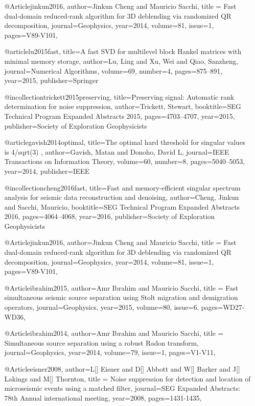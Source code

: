 @Article{jinkun2016,
  author={Jinkun Cheng and Mauricio Sacchi},
  title = {Fast dual-domain reduced-rank algorithm for 3{D} deblending via randomized QR decomposition},
  journal={Geophysics},
  year=2014,
  volume=81,
  issue=1,
  pages={V89-V101},
}

@article{lu2015fast,
  title={A fast SVD for multilevel block Hankel matrices with minimal memory storage},
  author={Lu, Ling and Xu, Wei and Qiao, Sanzheng},
  journal={Numerical Algorithms},
  volume={69},
  number={4},
  pages={875--891},
  year={2015},
  publisher={Springer}
}

@incollection{trickett2015preserving,
  title={Preserving signal: Automatic rank determination for noise suppression},
  author={Trickett, Stewart},
  booktitle={SEG Technical Program Expanded Abstracts 2015},
  pages={4703--4707},
  year={2015},
  publisher={Society of Exploration Geophysicists}
}

@article{gavish2014optimal,
  title={The optimal hard threshold for singular values is 4/sqrt(3) },
  author={Gavish, Matan and Donoho, David L},
  journal={IEEE Transactions on Information Theory},
  volume={60},
  number={8},
  pages={5040--5053},
  year={2014},
  publisher={IEEE}
}

@incollection{cheng2016fast,
  title={Fast and memory-efficient singular spectrum analysis for seismic data reconstruction and denoising},
  author={Cheng, Jinkun and Sacchi, Mauricio},
  booktitle={SEG Technical Program Expanded Abstracts 2016},
  pages={4064--4068},
  year={2016},
  publisher={Society of Exploration Geophysicists}
}

@Article{jinkun2016,
  author={Jinkun Cheng and Mauricio Sacchi},
  title = {Fast dual-domain reduced-rank algorithm for 3{D} deblending via randomized QR decomposition},
  journal={Geophysics},
  year=2014,
  volume=81,
  issue=1,
  pages={V89-V101},
}

@Article{ibrahim2015,
  author={Amr Ibrahim and Mauricio Sacchi},
  title = {Fast simultaneous seismic source separation using Stolt migration and demigration operators},
  journal={Geophysics},
  year=2015,
  volume=80,
  issue=6,
  pages={WD27-WD36},
}

@Article{ibrahim2014,
  author={Amr Ibrahim and Mauricio Sacchi},
  title = {Simultaneous source separation using a robust {R}adon transform},
  journal={Geophysics},
  year=2014,
  volume=79,
  issue=1,
  pages={V1-V11},
}


@Article{eisner2008,
  author={L[] Eisner and D[] Abbott and W[] Barker and J[] Lakings and M[] Thornton},
  title = {Noise suppression for detection and location of microseismic events using a matched filter},
  journal={SEG Expanded Abstracts: 78th Annual international meeting},
  year=2008,
  pages={1431-1435},
}

